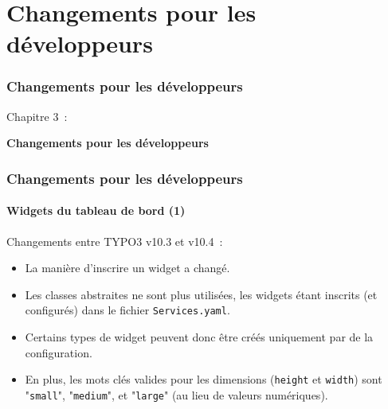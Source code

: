 %

\section{Changements pour les développeurs}
\begin{frame}[fragile]
	\frametitle{Changements pour les développeurs}

	\begin{center}\huge{Chapitre 3~:}\end{center}
	\begin{center}\huge{\color{typo3darkgrey}\textbf{Changements pour les développeurs}}\end{center}

\end{frame}


\begin{frame}[fragile]
	\frametitle{Changements pour les développeurs}
	\framesubtitle{Widgets du tableau de bord (1)}

	Changements entre TYPO3 v10.3 et v10.4~:

	\begin{itemize}
		\item La manière d'inscrire un widget a changé.
		\item Les classes abstraites ne sont plus utilisées, les widgets étant inscrits
			(et configurés) dans le fichier \texttt{Services.yaml}.
		\item Certains types de widget peuvent donc être créés uniquement par de la configuration.
		\item En plus, les mots clés valides pour les dimensions (\texttt{height} et \texttt{width}) sont
			"\texttt{small}", "\texttt{medium}", et "\texttt{large}"
			(au lieu de valeurs numériques).
	\end{itemize}

\end{frame}


